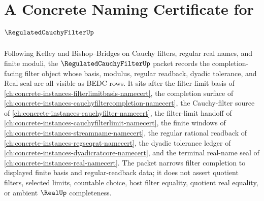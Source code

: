 \chapter{A Concrete Naming Certificate for $\RegulatedCauchyFilterUp$}
\label{ch:concrete-instances-regulated-cauchy-filter-namecert}

Following Kelley and Bishop--Bridges on Cauchy filters, regular real names, and finite moduli, the $\RegulatedCauchyFilterUp$ packet records the completion-facing filter object whose basis, modulus, regular readback, dyadic tolerance, and Real seal are all visible as BEDC rows. It sits after the filter-limit basis of \autoref{ch:concrete-instances-filterlimitbasis-namecert}, the completion surface of \autoref{ch:concrete-instances-cauchyfiltercompletion-namecert}, the Cauchy-filter source of \autoref{ch:concrete-instances-cauchyfilter-namecert}, the filter-limit handoff of \autoref{ch:concrete-instances-cauchyfilterlimit-namecert}, the finite windows of \autoref{ch:concrete-instances-streamname-namecert}, the regular rational readback of \autoref{ch:concrete-instances-regseqrat-namecert}, the dyadic tolerance ledger of \autoref{ch:concrete-instances-dyadicratcore-namecert}, and the terminal real-name seal of \autoref{ch:concrete-instances-real-namecert}. The packet narrows filter completion to displayed finite basis and regular-readback data; it does not assert quotient filters, selected limits, countable choice, host filter equality, quotient real equality, or ambient $\RealUp$ completeness.

